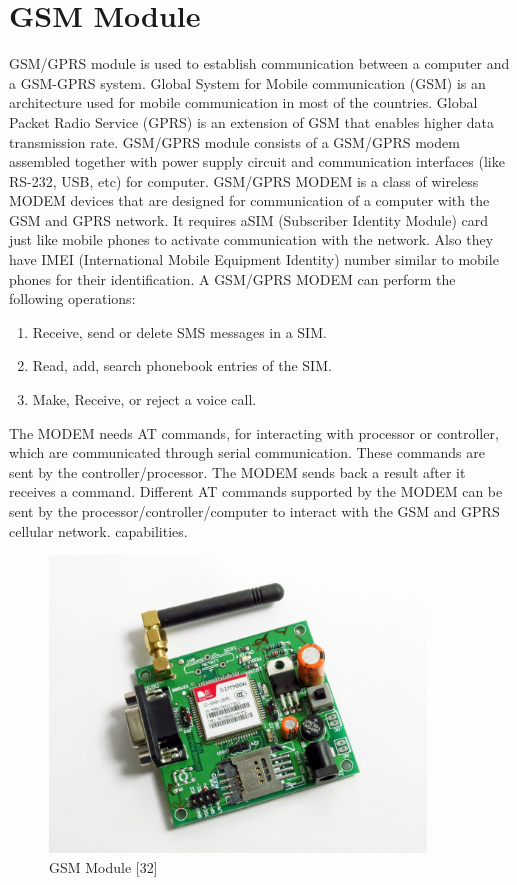 \documentclass[twoside,a4paper,16pt]{book}
\begin{document}
{{\section{GSM Module }
GSM/GPRS module is used to establish communication between a computer and a GSM-GPRS system. Global System for Mobile communication (GSM) is an architecture used for mobile communication in most of the countries. Global Packet Radio Service (GPRS) is an extension of GSM that enables higher data transmission rate. GSM/GPRS module consists of a GSM/GPRS modem assembled together with power supply circuit and communication interfaces (like RS-232, USB, etc) for computer. GSM/GPRS MODEM is a class of wireless MODEM devices that are designed for communication of a computer with the GSM and GPRS network. It requires aSIM (Subscriber Identity Module) card just like mobile phones to activate communication with the network. Also they have IMEI (International Mobile Equipment Identity) number similar to mobile phones for their identification. A GSM/GPRS MODEM can perform the following operations: 
\begin{enumerate}
	\item Receive, send or delete SMS messages in a SIM.
	\item Read, add, search phonebook entries of the SIM.
	\item Make, Receive, or reject a voice call.
\end{enumerate}
   

The MODEM needs AT commands, for interacting with processor or controller, which are communicated through serial communication. These commands are sent by the controller/processor. The MODEM sends back a result after it receives a command. Different AT commands supported by the MODEM can be sent by the processor/controller/computer to interact with the GSM and GPRS cellular network. capabilities.
\begin{figure}[ht!]
	\begin{center}
		\includegraphics[width=10.0cm]{12.jpg}
		\caption{GSM Module [32]}
	\end{center}
\end{figure}
}}
\end{document}
